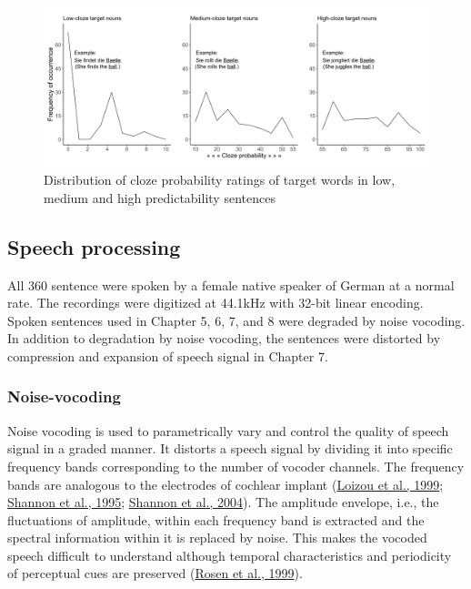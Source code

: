 \documentclass[a4paper, nobind]{templates/ociamthesis}
\begin{document}
\begin{figure}

{\centering \includegraphics[width=0.9\linewidth]{figures/materials/cloze-distribution} 

}

\caption{Distribution of cloze probability ratings of target words in low, medium and high predictability sentences}\label{fig:cloze-distribution}
\end{figure}

\hypertarget{speech-processing}{%
\subsection{Speech processing}\label{speech-processing}}

All 360 sentence were spoken by a female native speaker of German at a normal rate.
The recordings were digitized at 44.1kHz with 32-bit linear encoding.
Spoken sentences used in Chapter 5, 6, 7, and 8 were degraded by noise vocoding.
In addition to degradation by noise vocoding, the sentences were distorted by compression and expansion of speech signal in Chapter 7.

\hypertarget{noise-vocoding}{%
\subsubsection{Noise-vocoding}\label{noise-vocoding}}

Noise vocoding is used to parametrically vary and control the quality of speech signal in a graded manner.
It distorts a speech signal by dividing it into specific frequency bands corresponding to the number of vocoder channels.
The frequency bands are analogous to the electrodes of cochlear implant (\protect\hyperlink{ref-Loizou1999}{Loizou et al., 1999}; \protect\hyperlink{ref-Shannon1995}{Shannon et al., 1995}; \protect\hyperlink{ref-Shannon2004}{Shannon et al., 2004}).
The amplitude envelope, i.e., the fluctuations of amplitude, within each frequency band is extracted and the spectral information within it is replaced by noise.
This makes the vocoded speech difficult to understand although temporal characteristics and periodicity of perceptual cues are preserved (\protect\hyperlink{ref-Rosen1999}{Rosen et al., 1999}).
\end{document}
